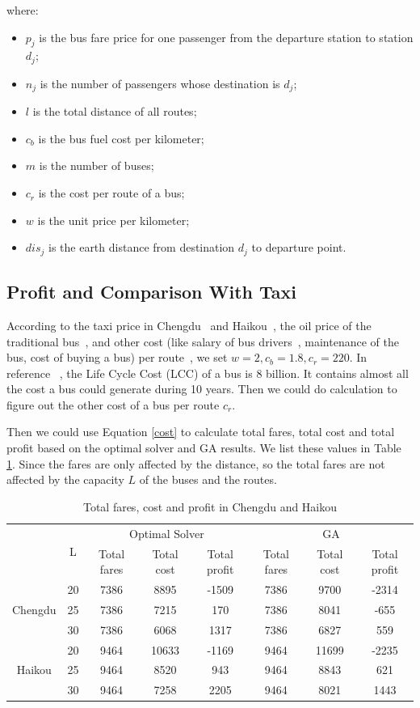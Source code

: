 \documentclass{llncs}
\begin{document}
	where:
	\begin{itemize}
		\item $p_j$ is the bus fare price for one passenger from the departure station to station $d_j$;
		\item $n_j$ is the number of passengers whose destination is $d_j$;
		\item $l$ is the total distance of all routes;
		\item $c_b$ is the bus fuel cost per kilometer;
		\item $m$ is the number of buses;
		\item $c_r$ is the cost per route of a bus;
		\item $w$ is the unit price per kilometer;
		\item $dis_j$ is the earth distance from destination $d_j$ to departure point.
	\end{itemize}
	
\subsection{Profit and Comparison With Taxi}
    	According to the taxi price in Chengdu~\cite{chengdu_taxi} and Haikou~\cite{haikou_taxi}, the oil price of the traditional bus~\cite{oilprice}, and other cost (like salary of bus drivers~\cite{salary}, maintenance of the bus, cost of buying a bus) per route~\cite{othercost}, we set $w=2,c_b=1.8,c_r=220$. In reference ~\cite{othercost}, the Life Cycle Cost (LCC) of a bus is 8 billion. It contains almost all the cost a bus could generate during 10 years. Then we could do calculation to figure out the other cost of a bus per route $c_r$.
	
	Then we could use Equation \ref{cost} to calculate total fares, total cost and total profit based on the optimal solver and GA results. We list these values in Table \ref{cost_table}. Since the fares are only affected by the distance, so the total fares are not affected by the capacity $L$ of the buses and the routes.
	\begin{table}
		\centering
		\caption{Total fares, cost and profit in Chengdu and Haikou}\label{cost_table}
		\begin{tabular}{|c|c|c|c|c|c|c|c|}
			\hline
			 &\multirow{2}{*}{L}&\multicolumn{3}{c|}{Optimal Solver} & \multicolumn{3}{c|}{GA}\\
			 \cline{3-8}
			 &&Total fares&Total cost&Total profit&Total fares&Total cost&Total profit\\
			 \hline
			 \multirow{3}{*}{Chengdu}&20&7386&8895&-1509&7386&9700&-2314\\
			 \cline{2-8}
			 &25&7386&7215&170&7386&8041&-655\\
			 \cline{2-8}
			 &30&7386&6068&1317&7386&6827&559\\
			 \hline
			 \multirow{3}{*}{Haikou}&20&9464&10633&-1169&9464&11699&-2235\\
			 \cline{2-8}
			 &25&9464&8520&943&9464&8843&621\\
			 \cline{2-8}
			 &30&9464&7258&2205&9464&8021&1443\\
			 \hline
		\end{tabular}
	\end{table}
\end{document}
